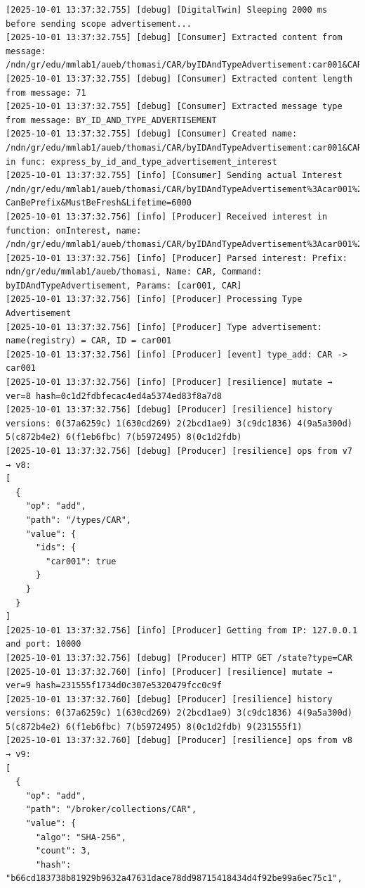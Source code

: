 \documentclass{article}
\begin{document}
\begin{lstlisting}[language=log, caption={Producer SeEDS Service logs after publishing \textit{@ids=car001,car002} to the \textit{@type=CAR} registry}, label={lst:publish-to-registry}]
[2025-10-01 13:37:32.755] [debug] [DigitalTwin] Sleeping 2000 ms before sending scope advertisement...
[2025-10-01 13:37:32.755] [debug] [Consumer] Extracted content from message: /ndn/gr/edu/mmlab1/aueb/thomasi/CAR/byIDAndTypeAdvertisement:car001&CAR
[2025-10-01 13:37:32.755] [debug] [Consumer] Extracted content length from message: 71
[2025-10-01 13:37:32.755] [debug] [Consumer] Extracted message type from message: BY_ID_AND_TYPE_ADVERTISEMENT
[2025-10-01 13:37:32.755] [debug] [Consumer] Created name: /ndn/gr/edu/mmlab1/aueb/thomasi/CAR/byIDAndTypeAdvertisement:car001&CAR in func: express_by_id_and_type_advertisement_interest
[2025-10-01 13:37:32.755] [info] [Consumer] Sending actual Interest /ndn/gr/edu/mmlab1/aueb/thomasi/CAR/byIDAndTypeAdvertisement%3Acar001%26CAR?CanBePrefix&MustBeFresh&Lifetime=6000
[2025-10-01 13:37:32.756] [info] [Producer] Received interest in function: onInterest, name: /ndn/gr/edu/mmlab1/aueb/thomasi/CAR/byIDAndTypeAdvertisement%3Acar001%26CAR
[2025-10-01 13:37:32.756] [info] [Producer] Parsed interest: Prefix: ndn/gr/edu/mmlab1/aueb/thomasi, Name: CAR, Command: byIDAndTypeAdvertisement, Params: [car001, CAR]
[2025-10-01 13:37:32.756] [info] [Producer] Processing Type Advertisement
[2025-10-01 13:37:32.756] [info] [Producer] Type advertisement: name(registry) = CAR, ID = car001
[2025-10-01 13:37:32.756] [info] [Producer] [event] type_add: CAR -> car001
[2025-10-01 13:37:32.756] [info] [Producer] [resilience] mutate → ver=8 hash=0c1d2fdbfecac4ed4a5374ed83f8a7d8
[2025-10-01 13:37:32.756] [debug] [Producer] [resilience] history versions: 0(37a6259c) 1(630cd269) 2(2bcd1ae9) 3(c9dc1836) 4(9a5a300d) 5(c872b4e2) 6(f1eb6fbc) 7(b5972495) 8(0c1d2fdb) 
[2025-10-01 13:37:32.756] [debug] [Producer] [resilience] ops from v7 → v8:
[
  {
    "op": "add",
    "path": "/types/CAR",
    "value": {
      "ids": {
        "car001": true
      }
    }
  }
]
[2025-10-01 13:37:32.756] [info] [Producer] Getting from IP: 127.0.0.1 and port: 10000
[2025-10-01 13:37:32.756] [debug] [Producer] HTTP GET /state?type=CAR
[2025-10-01 13:37:32.760] [info] [Producer] [resilience] mutate → ver=9 hash=231555f1734d0c307e5320479fcc0c9f
[2025-10-01 13:37:32.760] [debug] [Producer] [resilience] history versions: 0(37a6259c) 1(630cd269) 2(2bcd1ae9) 3(c9dc1836) 4(9a5a300d) 5(c872b4e2) 6(f1eb6fbc) 7(b5972495) 8(0c1d2fdb) 9(231555f1) 
[2025-10-01 13:37:32.760] [debug] [Producer] [resilience] ops from v8 → v9:
[
  {
    "op": "add",
    "path": "/broker/collections/CAR",
    "value": {
      "algo": "SHA-256",
      "count": 3,
      "hash": "b66cd183738b81929b9632a47631dace78dd98715418434d4f92be99a6ec75c1",

\end{lstlisting}
\end{document}
